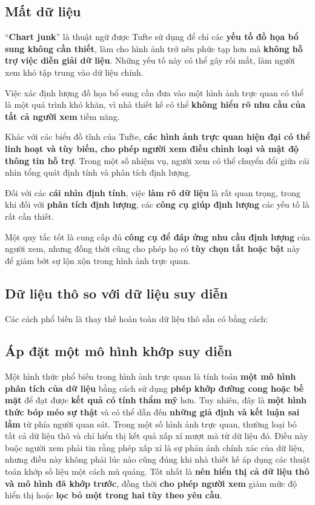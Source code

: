 \subsection{Mất dữ liệu}\label{mux1ea5t-dux1eef-liux1ec7u}

``\textbf{Chart junk}'' là thuật ngữ được Tufte sử dụng để chỉ các
\textbf{yếu tố đồ họa bổ sung không cần thiết}, làm cho hình ảnh trở nên
phức tạp hơn mà \textbf{không hỗ trợ việc diễn giải dữ liệu}. Những yếu
tố này có thể gây rối mắt, làm người xem khó tập trung vào dữ liệu
chính.

Việc xác định lượng đồ họa bổ sung cần đưa vào một hình ảnh trực quan có
thể là một quá trình khó khăn, vì nhà thiết kế có thể \textbf{không hiểu
rõ nhu cầu của tất cả người xem} tiềm năng.

Khác với các biểu đồ tĩnh của Tufte, \textbf{các hình ảnh trực quan hiện
đại có thể linh hoạt và tùy biến, cho phép người xem điều chỉnh loại và
mật độ thông tin hỗ trợ}. Trong một số nhiệm vụ, người xem có thể chuyển
đổi giữa cái nhìn tổng quát định tính và phân tích định lượng.

Đối với các \textbf{cái nhìn định tính}, việc \textbf{làm rõ dữ liệu} là
rất quan trọng, trong khi đối với \textbf{phân tích định lượng}, các
\textbf{công cụ giúp định lượng} các yếu tố là rất cần thiết.

Một quy tắc tốt là cung cấp đủ \textbf{công cụ để đáp ứng nhu cầu định
lượng} của người xem, nhưng đồng thời cũng cho phép họ có \textbf{tùy
chọn tắt hoặc bật} này để giảm bớt sự lộn xộn trong hình ảnh trực quan.

\subsection{Dữ liệu thô so với dữ liệu suy
diễn}\label{dux1eef-liux1ec7u-thuxf4-so-vux1edbi-dux1eef-liux1ec7u-suy-diux1ec5n}

Các cách phổ biến là thay thế hoàn toàn dữ liệu thô sẵn có bằng cách:

\subsection{Áp đặt một mô hình khớp suy
diễn}\label{uxe1p-ux111ux1eb7t-mux1ed9t-muxf4-huxecnh-khux1edbp-suy-diux1ec5n}

Một hình thức phổ biến trong hình ảnh trực quan là tính toán \textbf{một
mô hình phân tích của dữ liệu} bằng cách sử dụng \textbf{phép khớp đường
cong hoặc bề mặt} để đạt được \textbf{kết quả có tính thẩm mỹ} hơn. Tuy
nhiên, đây là \textbf{một hình thức bóp méo sự thật} và có thể dẫn đến
\textbf{những giả định và kết luận sai lầm} từ phía người quan sát.
Trong một số hình ảnh trực quan, thường loại bỏ tất cả dữ liệu thô và
chỉ hiển thị kết quả xấp xỉ mượt mà từ dữ liệu đó. Điều này buộc người
xem phải tin rằng phép xấp xỉ là sự phản ánh chính xác của dữ liệu,
nhưng điều này không phải lúc nào cũng đúng khi nhà thiết kế áp dụng các
thuật toán khớp số liệu một cách mù quáng. Tốt nhất là \textbf{nên hiển
thị cả dữ liệu thô và mô hình đã khớp trước}, đồng thời \textbf{cho phép
người xem} giảm mức độ hiển thị hoặc \textbf{lọc bỏ một trong hai tùy
theo yêu cầu}.

